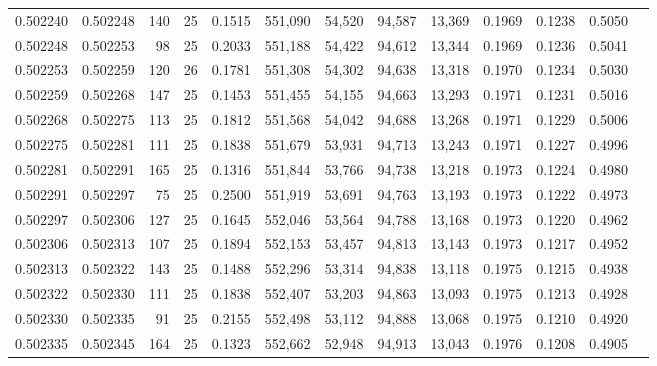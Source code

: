 \begin{tabular}{rrrrrrrrrrrrr}
0.502240 & 0.502248 & 140 &  25 &                                     0.1515 & 551,090 &  54,520 &  94,587 &  13,369 & 0.1969 & 0.1238 & 0.5050 \\
0.502248 & 0.502253 &  98 &  25 &                                     0.2033 & 551,188 &  54,422 &  94,612 &  13,344 & 0.1969 & 0.1236 & 0.5041 \\
0.502253 & 0.502259 & 120 &  26 &                                     0.1781 & 551,308 &  54,302 &  94,638 &  13,318 & 0.1970 & 0.1234 & 0.5030 \\
0.502259 & 0.502268 & 147 &  25 &                                     0.1453 & 551,455 &  54,155 &  94,663 &  13,293 & 0.1971 & 0.1231 & 0.5016 \\
0.502268 & 0.502275 & 113 &  25 &                                     0.1812 & 551,568 &  54,042 &  94,688 &  13,268 & 0.1971 & 0.1229 & 0.5006 \\
0.502275 & 0.502281 & 111 &  25 &                                     0.1838 & 551,679 &  53,931 &  94,713 &  13,243 & 0.1971 & 0.1227 & 0.4996 \\
0.502281 & 0.502291 & 165 &  25 &                                     0.1316 & 551,844 &  53,766 &  94,738 &  13,218 & 0.1973 & 0.1224 & 0.4980 \\
0.502291 & 0.502297 &  75 &  25 &                                     0.2500 & 551,919 &  53,691 &  94,763 &  13,193 & 0.1973 & 0.1222 & 0.4973 \\
0.502297 & 0.502306 & 127 &  25 &                                     0.1645 & 552,046 &  53,564 &  94,788 &  13,168 & 0.1973 & 0.1220 & 0.4962 \\
0.502306 & 0.502313 & 107 &  25 &                                     0.1894 & 552,153 &  53,457 &  94,813 &  13,143 & 0.1973 & 0.1217 & 0.4952 \\
0.502313 & 0.502322 & 143 &  25 &                                     0.1488 & 552,296 &  53,314 &  94,838 &  13,118 & 0.1975 & 0.1215 & 0.4938 \\
0.502322 & 0.502330 & 111 &  25 &                                     0.1838 & 552,407 &  53,203 &  94,863 &  13,093 & 0.1975 & 0.1213 & 0.4928 \\
0.502330 & 0.502335 &  91 &  25 &                                     0.2155 & 552,498 &  53,112 &  94,888 &  13,068 & 0.1975 & 0.1210 & 0.4920 \\
0.502335 & 0.502345 & 164 &  25 &                                     0.1323 & 552,662 &  52,948 &  94,913 &  13,043 & 0.1976 & 0.1208 & 0.4905 \\

\end{tabular}
